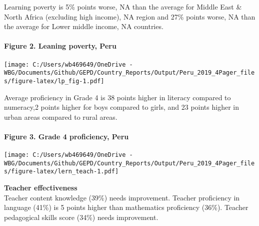 \documentclass[twocolumn]{article}
\let\oldparagraph\paragraph
\renewcommand{\paragraph}[1]{\oldparagraph{#1}\mbox{}}
\begin{document}
Learning poverty is 5\% points worse, NA than the average for Middle
East \& North Africa (excluding high income), NA region and 27\% points
worse, NA than the average for Lower middle income, NA countries.

\hypertarget{figure-2.-leaning-poverty-peru}{%
\paragraph{Figure 2. Leaning poverty,
Peru}\label{figure-2.-leaning-poverty-peru}}

\texttt{[image: C:/Users/wb469649/OneDrive - WBG/Documents/Github/GEPD/Country\_Reports/Output/Peru\_2019\_4Pager\_files/figure-latex/lp\_fig-1.pdf]}

Average proficiency in Grade 4 is 38 points higher in literacy compared
to numeracy,2 points higher for boys compared to girls, and 23 points
higher in urban areas compared to rural areas.

\hypertarget{figure-3.-grade-4-proficiency-peru}{%
\paragraph{Figure 3. Grade 4 proficiency,
Peru}\label{figure-3.-grade-4-proficiency-peru}}

\texttt{[image: C:/Users/wb469649/OneDrive - WBG/Documents/Github/GEPD/Country\_Reports/Output/Peru\_2019\_4Pager\_files/figure-latex/lern\_teach-1.pdf]}

\textbf{Teacher effectiveness}\\
Teacher content knowledge (39\%) needs improvement. Teacher proficiency
in language (41\%) is 5 points higher than mathematics proficiency
(36\%). Teacher pedagogical skills score (34\%) needs improvement.
\end{document}
